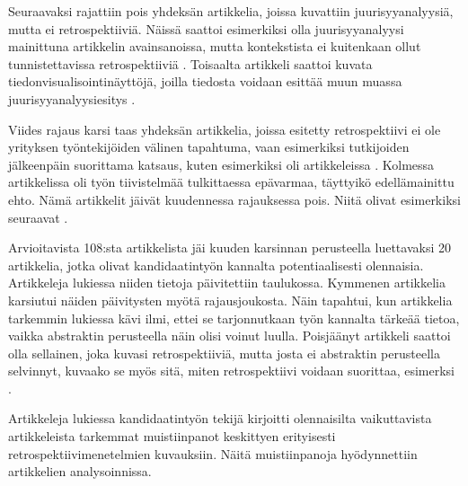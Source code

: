 Seuraavaksi rajattiin pois yhdeksän artikkelia, joissa kuvattiin juurisyyanalyysiä, mutta ei retrospektiiviä. Näissä saattoi esimerkiksi olla juurisyyanalyysi mainittuna artikkelin avainsanoissa, mutta kontekstista ei kuitenkaan ollut tunnistettavissa retrospektiiviä \citep{yu1998software}. Toisaalta artikkeli saattoi kuvata tiedonvisualisointinäyttöjä, joilla tiedosta voidaan esittää muun muassa juurisyyanalyysiesitys \citep{hao2008density}.

Viides rajaus karsi taas yhdeksän artikkelia, joissa esitetty retrospektiivi ei ole yrityksen työntekijöiden välinen tapahtuma, vaan esimerkiksi tutkijoiden jälkeenpäin suorittama katsaus, kuten esimerkiksi oli artikkeleissa \citep{wolforth2010generalizable, ardimento2004multiview}. Kolmessa artikkelissa oli työn tiivistelmää tulkittaessa epävarmaa, täyttyikö edellämainittu ehto. Nämä artikkelit jäivät kuudennessa rajauksessa pois. Niitä olivat esimerkiksi seuraavat \citep{xu2012enabling, grady1996software}. 

Arvioitavista 108:sta artikkelista jäi kuuden karsinnan perusteella luettavaksi 20 artikkelia, jotka olivat kandidaatintyön kannalta potentiaalisesti olennaisia. Artikkeleja lukiessa niiden tietoja päivitettiin taulukossa. Kymmenen artikkelia karsiutui näiden päivitysten myötä rajausjoukosta. Näin tapahtui, kun artikkelia tarkemmin lukiessa kävi ilmi, ettei se tarjonnutkaan työn kannalta tärkeää tietoa, vaikka abstraktin perusteella näin olisi voinut luulla. Poisjäänyt artikkeli saattoi olla sellainen, joka kuvasi retrospektiiviä, mutta josta ei abstraktin perusteella selvinnyt, kuvaako se myös sitä, miten retrospektiivi voidaan suorittaa, esimerksi \citep{glass2002loyal, drury2012obstacles}.

Artikkeleja lukiessa kandidaatintyön tekijä kirjoitti olennaisilta vaikuttavista artikkeleista tarkemmat muistiinpanot keskittyen erityisesti retrospektiivimenetelmien kuvauksiin. Näitä muistiinpanoja hyödynnettiin artikkelien analysoinnissa.

